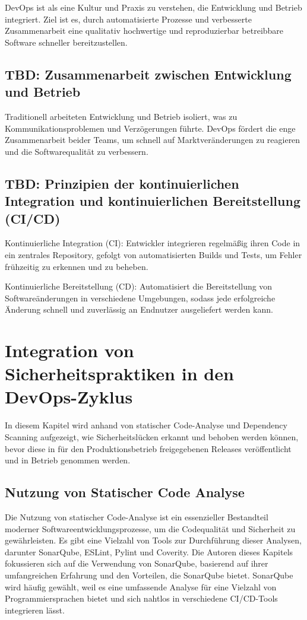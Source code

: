 \documentclass[conference,compsoc,final,a4paper]{IEEEtran}
\begin{document}
DevOps ist als eine Kultur und Praxis zu verstehen, die Entwicklung und Betrieb integriert. Ziel ist es, durch automatisierte Prozesse und verbesserte Zusammenarbeit eine qualitativ hochwertige und reproduzierbar betreibbare Software schneller bereitzustellen.

\subsection{TBD: Zusammenarbeit zwischen Entwicklung und Betrieb}
Traditionell arbeiteten Entwicklung und Betrieb isoliert, was zu Kommunikationsproblemen und Verzögerungen führte. DevOps fördert die enge Zusammenarbeit beider Teams, um schnell auf Marktveränderungen zu reagieren und die Softwarequalität zu verbessern.


\subsection{TBD: Prinzipien der kontinuierlichen Integration und kontinuierlichen Bereitstellung (CI/CD)}
Kontinuierliche Integration (CI): Entwickler integrieren regelmäßig ihren Code in ein zentrales Repository, gefolgt von automatisierten Builds und Tests, um Fehler frühzeitig zu erkennen und zu beheben.

Kontinuierliche Bereitstellung (CD): Automatisiert die Bereitstellung von Softwareänderungen in verschiedene Umgebungen, sodass jede erfolgreiche Änderung schnell und zuverlässig an Endnutzer ausgeliefert werden kann.




\section{Integration von Sicherheitspraktiken in den DevOps-Zyklus}
In diesem Kapitel wird anhand von statischer Code-Analyse und Dependency Scanning aufgezeigt, wie Sicherheitslücken erkannt und behoben werden können, bevor diese in für den Produktionsbetrieb freigegebenen Releases veröffentlicht und in Betrieb genommen werden.


\subsection{Nutzung von Statischer Code Analyse}
Die Nutzung von statischer Code-Analyse ist ein essenzieller Bestandteil moderner Softwareentwicklungsprozesse, um die Codequalität und Sicherheit zu gewährleisten. Es gibt eine Vielzahl von Tools zur Durchführung dieser Analysen, darunter SonarQube, ESLint, Pylint und Coverity. Die Autoren dieses Kapitels fokussieren sich auf die Verwendung von SonarQube, basierend auf ihrer umfangreichen Erfahrung und den Vorteilen, die SonarQube bietet. SonarQube wird häufig gewählt, weil es eine umfassende Analyse für eine Vielzahl von Programmiersprachen bietet und sich nahtlos in verschiedene CI/CD-Tools integrieren lässt.
\end{document}
